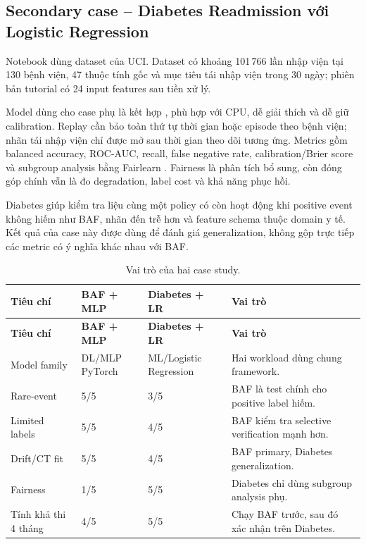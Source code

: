 \subsection{Secondary case -- Diabetes Readmission với Logistic Regression}

Notebook  dùng dataset  của UCI. Dataset có khoảng 101\,766 lần nhập viện tại 130 bệnh viện, 47 thuộc tính gốc và mục tiêu tái nhập viện trong 30 ngày; phiên bản tutorial có 24 input features sau tiền xử lý.

Model dùng cho case phụ là  kết hợp , phù hợp với CPU, dễ giải thích và dễ giữ calibration. Replay cần bảo toàn thứ tự thời gian hoặc episode theo bệnh viện; nhãn tái nhập viện chỉ được mở sau thời gian theo dõi tương ứng. Metrics gồm balanced accuracy, ROC-AUC, recall, false negative rate, calibration/Brier score và subgroup analysis bằng Fairlearn . Fairness là phân tích bổ sung, còn đóng góp chính vẫn là đo degradation, label cost và khả năng phục hồi.

Diabetes giúp kiểm tra liệu cùng một policy có còn hoạt động khi positive event không hiếm như BAF, nhãn đến trễ hơn và feature schema thuộc domain y tế. Kết quả của case này được dùng để đánh giá generalization, không gộp trực tiếp các metric có ý nghĩa khác nhau với BAF.

\begin{longtable}{@{}L{3.4cm} L{2cm} L{2cm} L{\dimexpr\linewidth-7.4cm-6\tabcolsep\relax}@{}}
\caption{Vai trò của hai case study.}\label{tab:summary-cases}\\
\toprule\textbf{Tiêu chí} & \textbf{BAF + MLP} & \textbf{Diabetes + LR} & \textbf{Vai trò}\\
\midrule\endfirsthead
\toprule\textbf{Tiêu chí} & \textbf{BAF + MLP} & \textbf{Diabetes + LR} & \textbf{Vai trò}\\
\midrule\endhead
Model family & DL/MLP PyTorch & ML/Logistic Regression & Hai workload dùng chung framework.\\
Rare-event & 5/5 & 3/5 & BAF là test chính cho positive label hiếm.\\
Limited labels & 5/5 & 4/5 & BAF kiểm tra selective verification mạnh hơn.\\
Drift/CT fit & 5/5 & 4/5 & BAF primary, Diabetes generalization.\\
Fairness & 1/5 & 5/5 & Diabetes chỉ dùng subgroup analysis phụ.\\
Tính khả thi 4 tháng & 4/5 & 5/5 & Chạy BAF trước, sau đó xác nhận trên Diabetes.\\
\bottomrule
\end{longtable}

